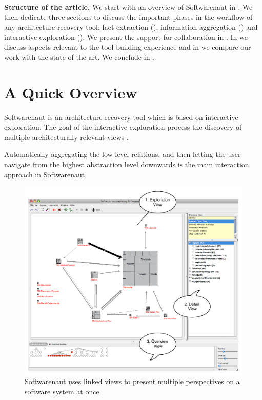 \documentclass[preprint,12pt]{elsarticle}
\begin{document}
{\footnotesize 
{\bf Structure of the article.} We start with an overview of Softwarenaut in . We then dedicate three sections to discuss the important phases in the workflow of any architecture recovery tool: fact-extraction (), information aggregation () and interactive exploration (). We present the support for collaboration in . In  we discuss aspects relevant to the tool-building experience and in  we compare our work with the state of the art. We conclude in .
}


\newpage
\section {A Quick Overview}
\label{sec:over}

Softwarenaut is an architecture recovery tool which is based on interactive exploration. The goal of the interactive exploration process the discovery of multiple architecturally relevant views \cite{lungu-packages}.

Automatically aggregating the low-level relations, and then letting the user navigate from the highest abstraction level downwards is the main interaction approach in Softwarenaut. 

\begin{figure}[h]
\begin{center}
\includegraphics[width=0.9\linewidth]{images/SnautOnSnaut}
\caption{Softwarenaut uses linked views to present multiple perspectives on a software system at once}
\end{center}
\end{figure}
\end{document}
